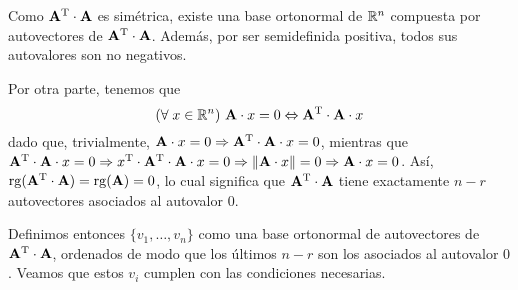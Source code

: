 Como $\mathbf{A}^{\mathrm{T}} \cdot \mathbf{A}$ es simétrica, existe una base ortonormal de
$\mathbb{R}^n$ compuesta por autovectores de $\mathbf{A}^{\mathrm{T}} \cdot \mathbf{A}$.
Además, por ser semidefinida positiva, todos sus autovalores son no negativos.

Por otra parte, tenemos que
\[ \left(\forall\;x \in \mathbb{R}^n\right)\, \mathbf{A} \cdot x = 0 \Leftrightarrow
    \mathbf{A}^{\mathrm{T}} \cdot \mathbf{A} \cdot x \]
dado que, trivialmente, $\mathbf{A} \cdot x = 0 \Rightarrow
\mathbf{A}^{\mathrm{T}} \cdot \mathbf{A} \cdot x = 0$, mientras que
$ \mathbf{A}^{\mathrm{T}} \cdot \mathbf{A} \cdot x = 0
    \Rightarrow x^{\mathrm{T}} \cdot \mathbf{A}^{\mathrm{T}} \cdot \mathbf{A} \cdot x = 0
    \Rightarrow \lVert \mathbf{A} \cdot x \rVert = 0
    \Rightarrow \mathbf{A} \cdot x = 0$.
Así, $\operatorname{rg}(\mathbf{A}^{\mathrm{T}} \cdot \mathbf{A}) = \operatorname{rg}(\mathbf{A}) = 0$, lo cual significa
que $\mathbf{A}^{\mathrm{T}} \cdot \mathbf{A}$ tiene exactamente $n - r$ autovectores
asociados al autovalor $0$.

Definimos entonces $\lbrace v_1, \dots, v_n \rbrace$ como una base ortonormal
de autovectores de $\mathbf{A}^{\mathrm{T}} \cdot \mathbf{A}$, ordenados de modo que los
últimos $n-r$ son los asociados al autovalor $0$. Veamos que estos $v_i$
cumplen con las condiciones necesarias.

